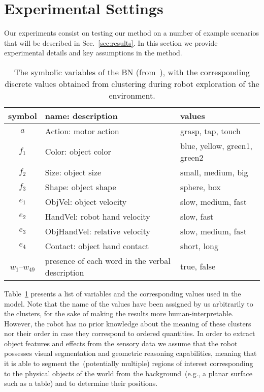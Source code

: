 \section{Experimental Settings}
\label{sec:experiments}
Our experiments consist on testing our method on a number of example scenarios that will be described in Sec.~\ref{sec:results}.
In this section we provide experimental details and key assumptions in the method.

\begin{table}
    \centering
    \caption{The symbolic variables of the \acl{BN} (from~\cite{salvi:2012:smcb}), with the corresponding discrete values obtained from clustering during robot exploration of the environment.}
    \label{tab:bnsymb}
    \begin{tabular}{cp{3.3cm}l}
    \toprule
    symbol & name: description     & values \\
    \midrule
    $a$ & Action: motor action          & grasp, tap, touch \\
    \midrule
    $f_1$ & Color: object color   & blue, yellow, green1, green2 \\
    $f_2$ & Size: object size     & small, medium, big \\
    $f_3$ & Shape: object shape    & sphere, box \\ %
    \midrule
    $e_1$ & ObjVel: object velocity & slow, medium, fast \\
    $e_2$ & HandVel: robot hand velocity & slow, fast \\
    $e_3$ & ObjHandVel: relative \objecthand{} velocity & slow, medium, fast \\
    $e_4$ & Contact: object hand contact & short, long \\
    \midrule
    $w_1$--$w_{49}$ & presence of each word in the verbal description & true, false \\
    \bottomrule
    \end{tabular}
\end{table}

Table~\ref{tab:bnsymb} presents a list of variables and the corresponding values used in the \AffWords{} model.
Note that the name of the values have been assigned by us arbitrarily to the clusters, for the sake of making the results more human-interpretable.
However, the robot has no prior knowledge about the meaning of these clusters nor their order in case they correspond to ordered quantities.
In order to extract object features and effects from the sensory data we assume that the robot possesses visual segmentation and geometric reasoning capabilities, meaning that it is able to segment the~(potentially multiple) regions of interest corresponding to the physical objects of the world from the background~(e.g., a planar surface such as a table) and to determine their positions.

